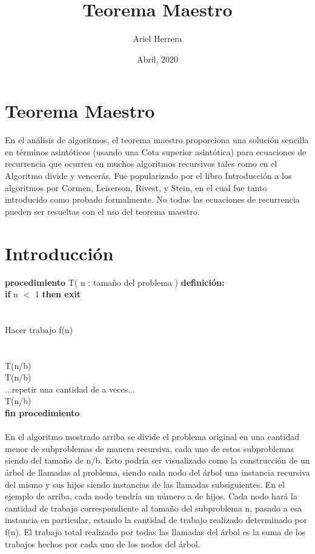 \documentclass{article} %
\title{Teorema Maestro}
\author{Ariel Herrera}
\date{Abril, 2020}
\begin{document}
\maketitle


\section{Teorema Maestro}
En el análisis de algoritmos, el teorema maestro proporciona una solución sencilla en términos asintóticos (usando una Cota superior asintótica) para ecuaciones de recurrencia que ocurren en muchos algoritmos recursivos tales como en el Algoritmo divide y vencerás. Fue popularizado por el libro Introducción a los algoritmos por Cormen, Leiserson, Rivest, y Stein, en el cual fue tanto introducido como probado formalmente. No todas las ecuaciones de recurrencia pueden ser resueltas con el uso del teorema maestro.\cite{wiki:xxx}


\tableofcontents

\section{Introducción}
 \textbf{procedimiento} T( n : tamaño del problema ) \textbf{definición:}\\
   \indent \indent \textbf{if} n $<$ 1 \textbf{then exit}\\
\\
\\
   \indent \indent Hacer trabajo f(n)\\
\\
\\
   \indent \indent T(n/b)\\
   \indent \indent T(n/b)\\
   \indent \indent ...repetir una cantidad de  a veces...\\
  \indent \indent T(n/b)\\
 \indent \textbf{fin procedimiento}\\\\
En el algoritmo mostrado arriba se divide el problema original en una cantidad menor de subproblemas de manera recursiva, cada uno de estos subproblemas siendo del tamaño de n/b. Esto podría ser visualizado como la construcción de un árbol de llamadas al problema, siendo cada nodo del árbol una instancia recursiva del mismo y sus hijos siendo instancias de las llamadas subsiguientes. En el ejemplo de arriba, cada nodo tendría un número a de hijos. Cada nodo hará la cantidad de trabajo correspondiente al tamaño del subproblema n, pasado a esa instancia en particular, estando la cantidad de trabajo realizado determinado por f(n). El trabajo total realizado por todas las llamadas del árbol es la suma de los trabajos hechos por cada uno de los nodos del árbol.
\end{document}
